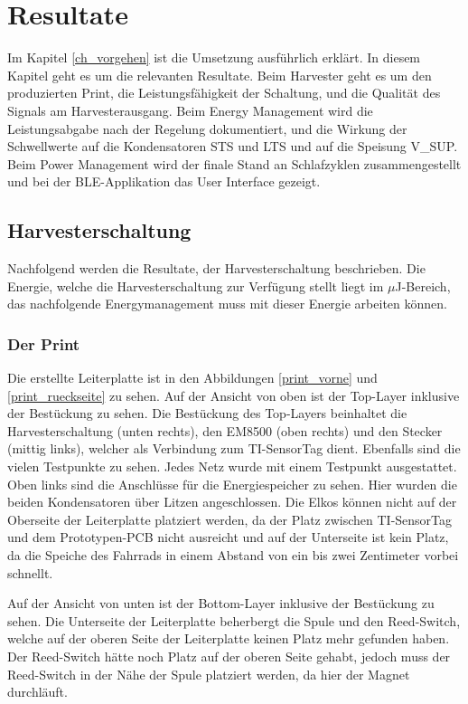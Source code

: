 \chapter{Resultate}
\label{ch_resultat}

Im Kapitel \ref{ch_vorgehen} ist die Umsetzung ausführlich erklärt. In diesem Kapitel geht es um die relevanten Resultate. Beim Harvester geht es um den produzierten Print, die Leistungsfähigkeit der Schaltung, und die Qualität des Signals am Harvesterausgang. Beim Energy Management wird die Leistungsabgabe nach der Regelung dokumentiert, und die Wirkung der Schwellwerte auf die Kondensatoren STS und LTS und auf die Speisung V\_SUP. Beim Power Management wird der finale Stand an Schlafzyklen zusammengestellt und bei der BLE-Applikation das User Interface gezeigt.
 
\section{Harvesterschaltung}

Nachfolgend werden die Resultate, der Harvesterschaltung beschrieben. Die Energie, welche die Harvesterschaltung zur Verfügung stellt liegt im $\mu$J-Bereich, das nachfolgende Energymanagement muss mit dieser Energie arbeiten können.

\subsection{Der Print}

Die erstellte Leiterplatte ist in den Abbildungen \ref{print_vorne} und \ref{print_rueckseite} zu sehen. Auf der Ansicht von oben ist der Top-Layer inklusive der Bestückung zu sehen. Die Bestückung des Top-Layers beinhaltet die Harvesterschaltung (unten rechts), den EM8500 (oben rechts) und den Stecker (mittig links), welcher als Verbindung zum TI-SensorTag dient. Ebenfalls sind die vielen Testpunkte zu sehen. Jedes Netz wurde mit einem Testpunkt ausgestattet. Oben links sind die Anschlüsse für die Energiespeicher zu sehen. Hier wurden die beiden Kondensatoren über Litzen angeschlossen. Die Elkos können nicht auf der Oberseite der Leiterplatte platziert werden, da der Platz zwischen TI-SensorTag und dem Prototypen-PCB nicht ausreicht und auf der Unterseite ist kein Platz, da die Speiche des Fahrrads in einem Abstand von ein bis zwei Zentimeter vorbei schnellt. 

Auf der Ansicht von unten ist der Bottom-Layer inklusive der Bestückung zu sehen. Die Unterseite der Leiterplatte beherbergt die Spule und den Reed-Switch, welche auf der oberen Seite der Leiterplatte keinen Platz mehr gefunden haben. Der Reed-Switch hätte noch Platz auf der oberen Seite gehabt, jedoch muss der Reed-Switch in der Nähe der Spule platziert werden, da hier der Magnet durchläuft.

